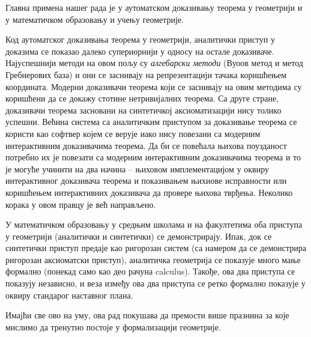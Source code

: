\documentclass[a4paper, 12pt]{article}
\begin{document}
Главна примена нашег рада је у аутоматском доказивању теорема у
геометрији и у математичком образовању и учењу геометрије.

Код аутоматског доказивања теорема у геометрији, аналитички приступ у
доказима се показао далеко супериорнији у односу на остале
доказиваче. Најуспешнији методи на овом пољу су \emph{алгебарски
  методи} (Вуоов метод\cite{wu} и метод Гребнерових
база\cite{buchberger,kapur}) и они се заснивају на репрезентацији
тачака коришћењем координата. Модерни доказивачи теорема који се
заснивају на овим методима су коришћени да се докажу стотине
нетривијалних теорема. Са друге стране, доказивачи теорема засновани
на синтетичкој аксиоматизацији нису толико успешни. Већина система са
аналитичким приступом за доказивање теорема се користи као софтвер
којем се верује иако нису повезани са модерним интерактивним
доказивачима теорема. Да би се повећала њихова поузданост потребно их
је повезати са модерним интерактивним доказивачима теорема и то је
могуће учинити на два начина -- њиховом имплементацијом у оквиру
интерактивног доказивача теорема и показивањем њихиове исправности или
коришћењем интерактивних доказивача да провере њихова
тврђења. Неколико корака у овом правцу је већ
направљено\cite{wucoq,thedu}.

У математичком образовању у средњим школама и на факултетима оба
приступа у геометрији (аналитички и синтетички) се
демонстрирају. Ипак, док се синтетички приступ предаје као ригорозан
систем (са намером да се демонстрира ригорозан аксиоматски приступ),
аналитичка геометрија се показује много мање формално (понекад само
као део рачуна calculus).  Такође, ова два приступа се показују
независно, и веза између ова два приступа се ретко формално показује у
оквиру стандарог наставног плана.

Имајћи све ово на уму, ова рад покушава да премости више празнина за
које мислимо да тренутно постоје у формализацији геометрије.
\end{document}
